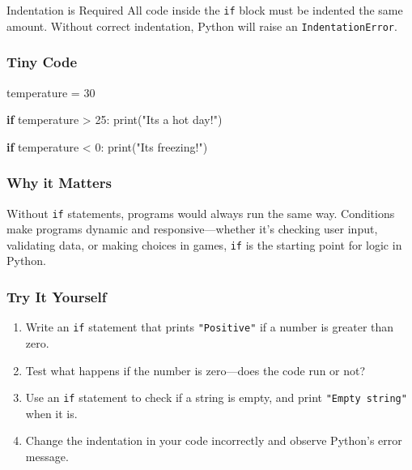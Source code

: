 \documentclass[
  letterpaper,
  DIV=11,
  numbers=noendperiod]{scrreprt}
\newenvironment{Shaded}{\begin{snugshade}}{\end{snugshade}}
\newcommand{\BuiltInTok}[1]{\textcolor[rgb]{0.00,0.23,0.31}{#1}}
\newcommand{\ControlFlowTok}[1]{\textcolor[rgb]{0.00,0.23,0.31}{\textbf{#1}}}
\newcommand{\DecValTok}[1]{\textcolor[rgb]{0.68,0.00,0.00}{#1}}
\newcommand{\NormalTok}[1]{\textcolor[rgb]{0.00,0.23,0.31}{#1}}
\newcommand{\OperatorTok}[1]{\textcolor[rgb]{0.37,0.37,0.37}{#1}}
\newcommand{\StringTok}[1]{\textcolor[rgb]{0.13,0.47,0.30}{#1}}
\providecommand{\tightlist}{%
  \setlength{\itemsep}{0pt}\setlength{\parskip}{0pt}}
\begin{document}
Indentation is Required All code inside the \texttt{if} block must be
indented the same amount. Without correct indentation, Python will raise
an \texttt{IndentationError}.

\subsubsection{Tiny Code}\label{tiny-code-13}

\begin{Shaded}
\begin{Highlighting}[]
\NormalTok{temperature }\OperatorTok{=} \DecValTok{30}

\ControlFlowTok{if}\NormalTok{ temperature }\OperatorTok{\textgreater{}} \DecValTok{25}\NormalTok{:}
    \BuiltInTok{print}\NormalTok{(}\StringTok{"It\textquotesingle{}s a hot day!"}\NormalTok{)}

\ControlFlowTok{if}\NormalTok{ temperature }\OperatorTok{\textless{}} \DecValTok{0}\NormalTok{:}
    \BuiltInTok{print}\NormalTok{(}\StringTok{"It\textquotesingle{}s freezing!"}\NormalTok{)}
\end{Highlighting}
\end{Shaded}

\subsubsection{Why it Matters}\label{why-it-matters-13}

Without \texttt{if} statements, programs would always run the same way.
Conditions make programs dynamic and responsive---whether it's checking
user input, validating data, or making choices in games, \texttt{if} is
the starting point for logic in Python.

\subsubsection{Try It Yourself}\label{try-it-yourself-13}

\begin{enumerate}
\def\labelenumi{\arabic{enumi}.}
\tightlist
\item
  Write an \texttt{if} statement that prints \texttt{"Positive"} if a
  number is greater than zero.
\item
  Test what happens if the number is zero---does the code run or not?
\item
  Use an \texttt{if} statement to check if a string is empty, and print
  \texttt{"Empty\ string"} when it is.
\item
  Change the indentation in your code incorrectly and observe Python's
  error message.
\end{enumerate}
\end{document}
